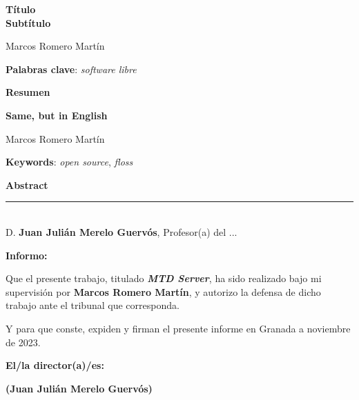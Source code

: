 \thispagestyle{empty}

\begin{center}
{\large\bfseries Título \\ Subtítulo }\\
\end{center}
\begin{center}
	Marcos Romero Martín\\
\end{center}


\vspace{0.5cm}
\noindent\textbf{Palabras clave}: \textit{software libre}
\vspace{0.7cm}

\noindent\textbf{Resumen}\\
	

\cleardoublepage

\begin{center}
	{\large\bfseries Same, but in English}\\
\end{center}
\begin{center}
	Marcos Romero Martín\\
\end{center}
\vspace{0.5cm}
\noindent\textbf{Keywords}: \textit{open source}, \textit{floss}
\vspace{0.7cm}

\noindent\textbf{Abstract}\\


\cleardoublepage

\thispagestyle{empty}

\noindent\rule[-1ex]{\textwidth}{2pt}\\[4.5ex]

D. \textbf{Juan Julián Merelo Guervós}, Profesor(a) del ...

\vspace{0.5cm}

\textbf{Informo:}

\vspace{0.5cm}

Que el presente trabajo, titulado \textit{\textbf{MTD Server}},
ha sido realizado bajo mi supervisión por \textbf{Marcos Romero Martín}, y autorizo la defensa de dicho trabajo ante el tribunal
que corresponda.

\vspace{0.5cm}

Y para que conste, expiden y firman el presente informe en Granada a noviembre de 2023.

\vspace{1cm}

\textbf{El/la director(a)/es: }

\vspace{5cm}

\noindent \textbf{(Juan Julián Merelo Guervós)}

